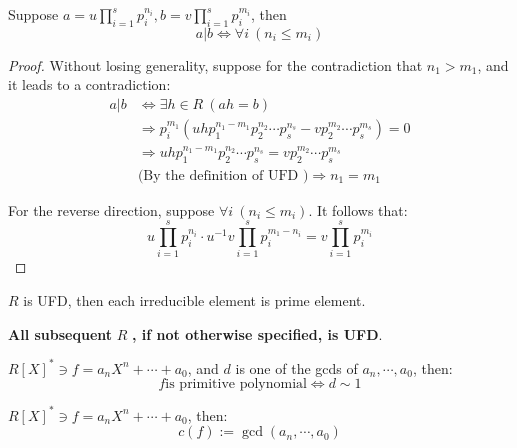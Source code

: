 \begin{corollary}
    Suppose $a = u \prod_{i=1}^s p_i^{n_i}, b = v \prod_{i=1}^{s} p_i^{m_i}$, then
    \[
        a | b \Leftrightarrow \forall i\ ( n_i \leq m_i) 
    \]
\end{corollary}
\begin{proof}
    Without losing generality, suppose for the contradiction that $n_1 > m_1$, and it leads to a contradiction:
    \begin{align*}
        a | b &\Leftrightarrow \exists h \in R\ (ah = b) \\
        & \Rightarrow p_{i}^{m_1} \left( u h p_1^{n_1 - m_1} p_2^{n_2} \cdots p_s^{n_s} - v p_2^{m_2} \cdots p_s^{m_s} \right) = 0\\
        &\Rightarrow u h p_1^{n_1 - m_1} p_2^{n_2} \cdots p_s^{n_s} =  v p_2^{m_2} \cdots p_s^{m_s} \\
        & \text{(By the definition of UFD )} \Rightarrow n_1 = m_1
    \end{align*}

    For the reverse direction, suppose $\forall i \ (n_i \leq m_i)$. It follows that:
    \[
        u \prod_{i=1}^s p_i^{n_i} \cdot u^{-1} v \prod_{i=1}^s p_{i}^{m_1 - n_i} = v \prod_{i=1}^{s} p_i^{m_i}
    \]
\end{proof}


\begin{proposition}
    $R$ is UFD, then each irreducible element is prime element.
\end{proposition}







\textbf{All subsequent} $R$ \textbf{, if not otherwise specified, is UFD}.


\begin{definition}
    $R[X]^* \ni f = a_n X^n + \cdots + a_0$, and $d$ is one of the gcds of $a_n, \cdots, a_0$, then:
    \[
        f \text{is primitive polynomial} \Leftrightarrow d \sim 1
    \]
\end{definition}



\begin{definition}
    $R[X]^* \ni f = a_n X^n + \cdots + a_0$, then:
    \[
        c(f) := \gcd(a_n, \cdots, a_0)
    \]
\end{definition}





